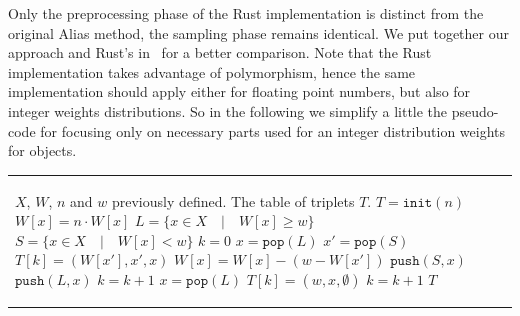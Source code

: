 Only the preprocessing phase of the Rust implementation is distinct from the original Alias method, 
the sampling phase remains identical.
We put together our approach and Rust's in~ for a better comparison.
Note that the Rust implementation takes advantage of polymorphism, hence the same implementation should apply either for floating point numbers, but also for integer weights distributions.
So in the following we simplify a little the pseudo-code for focusing only on necessary parts used for an integer distribution weights for objects.


\begin{algorithm}[htb]
\caption{Building of the Alias Table by Rust language and by our approach}
\label{algo:table}
    \begin{tabular}{l l}
        \begin{minipage}{0.48\textwidth}
            \begin{algorithmic}[1]
                \scriptsize
                \renewcommand{\algorithmicrequire}{\textbf{Input:}}
                \renewcommand{\algorithmicensure}{\textbf{Output:}}
                \Require $X$, $W$, $n$ and $w$ previously defined.
                \Ensure  The table of triplets $T$.
                \Function{Table\_Rust}{$X, n, W, w$}
                    \State $T = \texttt{init}(n)$ %
                    \For{$x \in X$}
                        \State $W[x] = n \cdot W[x]$ %
                    \EndFor
                    \State $L = \{x \in X \quad | \quad W[x] \geq w\}$ %
                    \State $S = \{x \in X \quad | \quad W[x] < w\}$ %
                    \State $k = 0$
                    \While{$S$ is not empty}
                        \State $x = \texttt{pop}(L)$ %
                        \State $x' = \texttt{pop}(S)$ 
                        \State $T[k] = (W[x'], x', x)$
                        \State $W[x] = W[x] - (w - W[x'])$
                        \If{$W[x] < w$}
                            \State $\texttt{push}(S, x)$ %
                        \Else
                            \State $\texttt{push}(L, x)$
                        \EndIf
                        \State $k = k + 1$
                    \EndWhile
                    \While{$L$ is not empty}
                        \State $x = \texttt{pop}(L)$
                        \State $T[k] = (w, x, \emptyset)$
                        \State $k = k + 1$
                    \EndWhile
                    \State \Return $T$
                \EndFunction
            \end{algorithmic}   
            

\end{minipage}
\end{tabular}
\end{algorithm}
